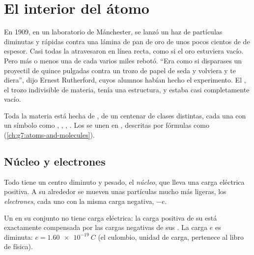 \chapter{El interior del átomo}\label{ch:g9:inside-the-atom}

En 1909, en un laboratorio de Mánchester, se lanzó un haz de partículas
diminutas y rápidas contra una lámina de pan de oro de unos pocos
cientos de  de espesor. Casi todas la atravesaron en línea recta,
como si el oro estuviera vacío. Pero más o menos una de cada varios miles
rebotó. ``Era como si disparases un proyectil de quince pulgadas contra
un trozo de papel de seda y volviera y te diera'', dijo Ernest
Rutherford, cuyos alumnos habían hecho el experimento. El , el trozo
indivisible de materia, tenía una estructura, y estaba casi
completamente vacío.

\begin{recall}
Toda la materia está hecha de , de un centenar de clases
distintas, cada una con un símbolo como , , , .
Los  se unen en , descritas por fórmulas como 
(\cref{ch:g7:atoms-and-molecules}).
\end{recall}

\section{Núcleo y electrones}

\begin{definition}\label{def:g9:inside-the-atom:nucleus}
Todo  tiene un centro diminuto y pesado, el
\emph{núcleo}, que lleva una carga eléctrica positiva. A
su alrededor se mueven unas partículas mucho más ligeras, los
\emph{electrones}, cada uno con la misma carga negativa,
$-e$.
\end{definition}

\begin{proposition}\label{prop:g9:inside-the-atom:neutral}
Un  en su conjunto no tiene carga eléctrica: la carga positiva de
su  está exactamente compensada por las cargas negativas de sus
. La carga $e$ es diminuta: $e = \qty{1.60e-19}{C}$ (el
culombio, unidad de carga, pertenece al libro de física).
\end{proposition}

